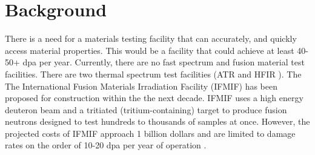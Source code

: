 \documentclass[final,3p,times,twocolumn]{elsarticle} %
\begin{document}
%
%
%
%
%
%
%
%
%
%

\section{Background}

There is a need for a materials testing facility that can accurately, and quickly access material properties. This would be a facility that could achieve at least 40-50+ dpa per year. Currently, there are no fast spectrum and fusion material test facilities. There are two thermal spectrum test facilities (ATR \cite{?} and HFIR \cite{lucas1990review}). The The International Fusion Materials Irradiation Facility (IFMIF) has been proposed for construction within the the next decade. IFMIF uses a high energy deuteron beam and a tritiated (tritium-containing) target to produce fusion neutrons designed to test hundreds to thousands of samples at once. However, the projected costs of IFMIF approach 1 billion dollars and are limited to damage rates on the order of 10-20 dpa per year of operation \cite{?}.
\end{document}
